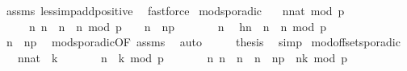 \begin{isabellebody}
%
\isadelimproof
%
\endisadelimproof
%
\isatagproof
{}\isamarkupfalse%
\ assms\ less{\isacharunderscore}imp{\isacharunderscore}add{\isacharunderscore}positive\ \isamarkupfalse%
\ fastforce%
\endisatagproof
{\isafoldproof}%
%
\isadelimproof
\isanewline
%
\endisadelimproof
\isanewline
{}\isamarkupfalse%
\ mod{\isacharunderscore}sporadic{\isacharprime}{\isacharcolon}\isanewline
\ \ \ {\isacartoucheopen}{\isacharparenleft}{\isacharparenleft}n{\isacharcolon}{\isacharcolon}nat{\isacharparenright}\ mod\ p\ {\isacharequal}\ {}{\isacharparenright}{\isacartoucheclose}\isanewline
\ \ \ \ \ {\isacartoucheopen}{\isasymforall}n{\isacharprime}{\isachardot}\ {\isacharparenleft}n\ {\isacharless}\ n{\isacharprime}\ {\isasymand}\ {\isacharparenleft}n{\isacharprime}\ mod\ p\ {\isacharequal}\ {}{\isacharparenright}{\isacharparenright}\ {\isasymlongrightarrow}\ n{\isacharprime}\ {\isasymge}\ n{\isacharplus}p{\isacartoucheclose}\isanewline
%
\isadelimproof
%
\endisadelimproof
%
\isatagproof
{}\isamarkupfalse%
\ {\isacharminus}\isanewline
\ \ \isacommand{{\isacharbraceleft}}\isamarkupfalse%
\ \isamarkupfalse%
\ n{\isacharprime}\ \isamarkupfalse%
\ h{\isacharcolon}{\isacartoucheopen}n\ {\isacharless}\ n{\isacharprime}\ {\isasymand}\ n{\isacharprime}\ mod\ p\ {\isacharequal}\ {}{\isacartoucheclose}\isanewline
\ \ \ \ \isamarkupfalse%
\ {\isacartoucheopen}n{\isacharprime}\ {\isasymge}\ n{\isacharplus}p{\isacartoucheclose}\ \isamarkupfalse%
\ mod{\isacharunderscore}sporadic{\isacharbrackleft}OF\ assms{\isacharbrackright}\ \isamarkupfalse%
\ auto\isanewline
\ \ \isacommand{{\isacharbraceright}}\isamarkupfalse%
\ \isamarkupfalse%
\ {\isacharquery}thesis\ \isamarkupfalse%
\ simp\isanewline
{}\isamarkupfalse%
%
\endisatagproof
{\isafoldproof}%
%
\isadelimproof
\isanewline
%
\endisadelimproof
\isanewline
{}\isamarkupfalse%
\ mod{\isacharunderscore}offset{\isacharunderscore}sporadic{\isacharcolon}\isanewline
\ \ \ {\isacartoucheopen}{\isacharparenleft}n{\isacharcolon}{\isacharcolon}nat{\isacharparenright}\ {\isasymge}\ k{\isacartoucheclose}\isanewline
\ \ \ \ \ \ \ {\isacartoucheopen}{\isacharparenleft}n\ {\isacharminus}\ k{\isacharparenright}\ mod\ p\ {\isacharequal}\ {}{\isacartoucheclose}\isanewline
\ \ \ \ \ {\isacartoucheopen}{\isasymforall}n{\isacharprime}{\isachardot}\ {\isacharparenleft}n\ {\isacharless}\ n{\isacharprime}\ {\isasymand}\ n{\isacharprime}\ {\isacharless}\ n{\isacharplus}p{\isacharparenright}\ {\isasymlongrightarrow}\ {\isasymnot}{\isacharparenleft}{\isacharparenleft}n{\isacharprime}{\isacharminus}k{\isacharparenright}\ mod\ p\ {\isacharequal}\ {}{\isacharparenright}{\isacartoucheclose}\isanewline

\end{isabellebody}

